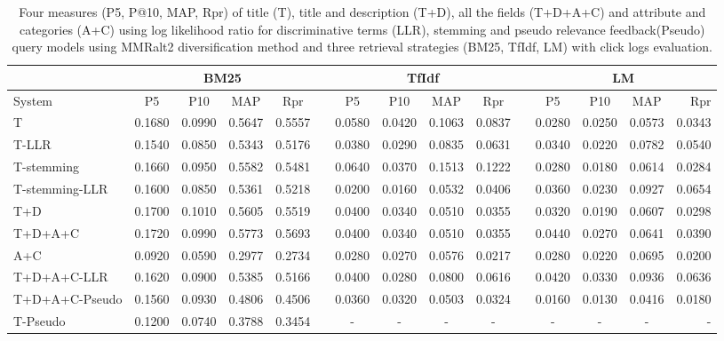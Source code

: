 \begin{table}[H]
\begin{center}
\scriptsize
\caption{
Four measures (P\@5, P@10, MAP, Rpr) of title (T), title and description (T+D), all the fields (T+D+A+C) and attribute and categories (A+C) using log likelihood ratio for discriminative terms (LLR), stemming and pseudo relevance feedback(Pseudo) query models using MMRalt2 diversification method and three retrieval strategies (BM25, TfIdf, LM) with click logs evaluation.}
\label{table:mmrAlt2Cl}

\begin{tabular}{lcccccccccccccr}
\toprule
 & \multicolumn{4}{c}{BM25} &    & \multicolumn{4}{c}{TfIdf} &    & \multicolumn{4}{c}{LM} \\
\midrule
System & P\@5 & P\@10 & MAP & Rpr &   & P\@5 & P\@10 & MAP & Rpr &   & P\@5 & P\@10 & MAP & Rpr \\
\midrule
T & 0.1680 & 0.0990 & 0.5647 & 0.5557 &   & 0.0580 & 0.0420 & 0.1063 & 0.0837 &   & 0.0280 & 0.0250 & 0.0573 & 0.0343 \\
T-LLR & 0.1540 & 0.0850 & 0.5343 & 0.5176 &   & 0.0380 & 0.0290 & 0.0835 & 0.0631 &   & 0.0340 & 0.0220 & 0.0782 & 0.0540 \\
T-stemming & 0.1660 & 0.0950 & 0.5582 & 0.5481 &   & 0.0640 & 0.0370 & 0.1513 & 0.1222 &   & 0.0280 & 0.0180 & 0.0614 & 0.0284 \\
T-stemming-LLR & 0.1600 & 0.0850 & 0.5361 & 0.5218 &   & 0.0200 & 0.0160 & 0.0532 & 0.0406 &   & 0.0360 & 0.0230 & 0.0927 & 0.0654 \\
T+D & 0.1700 & 0.1010 & 0.5605 & 0.5519 &   & 0.0400 & 0.0340 & 0.0510 & 0.0355 &   & 0.0320 & 0.0190 & 0.0607 & 0.0298 \\
T+D+A+C & 0.1720 & 0.0990 & 0.5773 & 0.5693 &   & 0.0400 & 0.0340 & 0.0510 & 0.0355 &   & 0.0440 & 0.0270 & 0.0641 & 0.0390 \\
A+C & 0.0920 & 0.0590 & 0.2977 & 0.2734 &   & 0.0280 & 0.0270 & 0.0576 & 0.0217 &   & 0.0280 & 0.0220 & 0.0695 & 0.0200 \\
T+D+A+C-LLR & 0.1620 & 0.0900 & 0.5385 & 0.5166 &   & 0.0400 & 0.0280 & 0.0800 & 0.0616 &   & 0.0420 & 0.0330 & 0.0936 & 0.0636 \\
T+D+A+C-Pseudo & 0.1560 & 0.0930 & 0.4806 & 0.4506 &   & 0.0360 & 0.0320 & 0.0503 & 0.0324 &   & 0.0160 & 0.0130 & 0.0416 & 0.0180 \\
T-Pseudo & 0.1200 & 0.0740 & 0.3788 & 0.3454 &   & - & - & - & - &   & - & - & - & -  \\
\bottomrule
\end{tabular}
\end{center}
\end{table}




